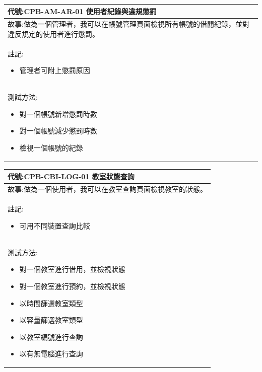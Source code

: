 \documentclass{article}
\begin{document}
\begin{table}
    \begin{tabular}{| m{13cm} |}
		\hline
	代號:CPB-AM-AR-01	使用者紀錄與違規懲罰	\\ \hline
	故事:做為一個管理者，我可以在帳號管理頁面檢視所有帳號的借閱紀錄，並對違反規定的使用者進行懲罰。		\\	\hline
	註記:
	\begin{itemize}
		\item 管理者可附上懲罰原因
	\end{itemize}		\\ \hline
	測試方法:	
	\begin{itemize}
		\item 對一個帳號新增懲罰時數
		\item 對一個帳號減少懲罰時數
		\item 檢視一個帳號的紀錄
	\end{itemize}
	\\	\hline
    \end{tabular}
\end{table}

\begin{table}
    \begin{tabular}{| m{13cm} |}
		\hline
	代號:CPB-CBI-LOG-01	教室狀態查詢	\\ \hline
	故事:做為一個使用者，我可以在教室查詢頁面檢視教室的狀態。		\\	\hline
	註記:
	\begin{itemize}
		\item 可用不同裝置查詢比較
	\end{itemize}		\\ \hline
	測試方法:	
	\begin{itemize}
		\item 對一個教室進行借用，並檢視狀態
		\item 對一個教室進行預約，並檢視狀態
		\item 以時間篩選教室類型
		\item 以容量篩選教室類型
		\item 以教室編號進行查詢
		\item 以有無電腦進行查詢
	\end{itemize}
	\\	\hline
    \end{tabular}
\end{table}
\end{document}
